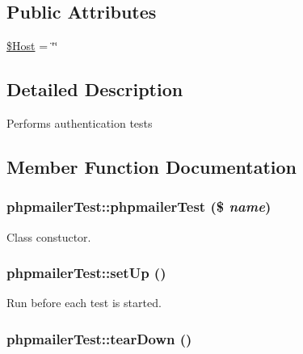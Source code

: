 \subsection*{Public Attributes}
\begin{CompactItemize}
\item 
\hyperlink{classphpmailerTest_efe5f111278483561370865caa8a0048}{\$Host} = \char`\"{}\char`\"{}
\end{CompactItemize}


\subsection{Detailed Description}
Performs authentication tests 

\subsection{Member Function Documentation}
\hypertarget{classphpmailerTest_2c284d8272ed4f05ae06c2fe65c8240f}{
\subsubsection[phpmailerTest]{\setlength{\rightskip}{0pt plus 5cm}phpmailerTest::phpmailerTest (\$ {\em name})}}
\label{classphpmailerTest_2c284d8272ed4f05ae06c2fe65c8240f}


Class constuctor. \hypertarget{classphpmailerTest_5b3345868cb74b86eaa3cf986248e73a}{
\subsubsection[setUp]{\setlength{\rightskip}{0pt plus 5cm}phpmailerTest::setUp ()}}
\label{classphpmailerTest_5b3345868cb74b86eaa3cf986248e73a}


Run before each test is started. \hypertarget{classphpmailerTest_3a302ac3c1b988c9cff8d9d505684f4b}{
\subsubsection[tearDown]{\setlength{\rightskip}{0pt plus 5cm}phpmailerTest::tearDown ()}}
\label{classphpmailerTest_3a302ac3c1b988c9cff8d9d505684f4b}


